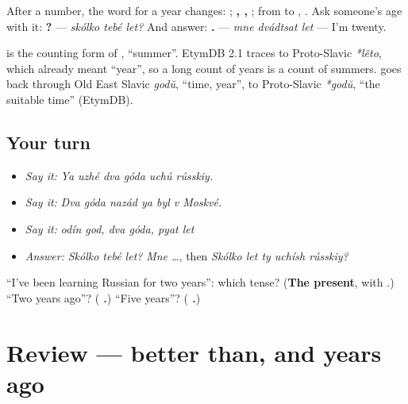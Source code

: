 \begin{grammarlens}[title={Grammar Lens: \ru{год}, \ru{года}, \ru{лет}}]
After a number, the word for a year changes: \textbf{ }; \textbf{, ,  }; from \textbf{} to \textbf{}, \textbf{}. Ask someone's age with it: \textbf{  ?} — \emph{skólko tebé let?} And answer: \textbf{  .} — \emph{mne dvádtsat let} — I'm twenty.
\end{grammarlens}

\begin{cousinweb}
\textbf{} is the counting form of \textbf{}, \textquotedblleft{}summer\textquotedblright{}. EtymDB 2.1 traces \emph{} to Proto-Slavic \emph{*lěto}, which already meant \textquotedblleft{}year\textquotedblright{}, so a long count of years is a count of summers. \textbf{} goes back through Old East Slavic \emph{godŭ}, \textquotedblleft{}time, year\textquotedblright{}, to Proto-Slavic \emph{*godŭ}, \textquotedblleft{}the suitable time\textquotedblright{} (EtymDB).
\end{cousinweb}

\subsection*{Your turn}
\begin{itemize}
\raggedright
  \item \emph{Say it:} \emph{Ya uzhé dva góda uchú rússkiy.}
  \item \emph{Say it:} \emph{Dva góda nazád ya byl v Moskvé.}
  \item \emph{Say it:} \emph{odín god, dva góda, pyat let}
  \item \emph{Answer:} \emph{Skólko tebé let?} \emph{Mne …}, then \emph{Skólko let ty uchísh rússkiy?}
\end{itemize}

\begin{tcolorbox}[breakable,colback=teal!4,colframe=teal!35!black,title={Before you move on}]
\textquotedblleft{}I've been learning Russian for two years\textquotedblright{}: which tense? (\textbf{The present}, with \emph{\textbf{}}.) \textquotedblleft{}Two years ago\textquotedblright{}? (\emph{\textbf{  .}}) \textquotedblleft{}Five years\textquotedblright{}? (\emph{\textbf{ .}})
\end{tcolorbox}
\section[(review)]{Review — better than, and years ago}

